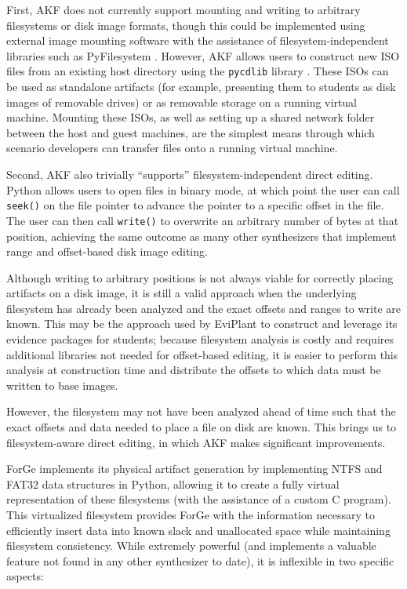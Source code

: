 \documentclass[letterpaper,12pt]{report}
\newcommand{\passthrough}[1]{#1}
\begin{document}
First, AKF does not currently support mounting and writing to arbitrary
filesystems or disk image formats, though this could be implemented
using external image mounting software with the assistance of
filesystem-independent libraries such as PyFilesystem
\cite{PyFilesystemPyfilesystem22025}. However, AKF allows users to
construct new ISO files from an existing host directory using the
\passthrough{\lstinline!pycdlib!} library
\cite{lalancetteClalancettePycdlib2025}. These ISOs can be used as
standalone artifacts (for example, presenting them to students as disk
images of removable drives) or as removable storage on a running virtual
machine. Mounting these ISOs, as well as setting up a shared network
folder between the host and guest machines, are the simplest means
through which scenario developers can transfer files onto a running
virtual machine.

Second, AKF also trivially ``supports'' filesystem-independent direct
editing. Python allows users to open files in binary mode, at which
point the user can call \passthrough{\lstinline!seek()!} on the file
pointer to advance the pointer to a specific offset in the file. The
user can then call \passthrough{\lstinline!write()!} to overwrite an
arbitrary number of bytes at that position, achieving the same outcome
as many other synthesizers that implement range and offset-based disk
image editing.

Although writing to arbitrary positions is not always viable for
correctly placing artifacts on a disk image, it is still a valid
approach when the underlying filesystem has already been analyzed and
the exact offsets and ranges to write are known. This may be the
approach used by EviPlant \cite{scanlonEviPlantEfficientDigital2017}
to construct and leverage its evidence packages for students; because
filesystem analysis is costly and requires additional libraries not
needed for offset-based editing, it is easier to perform this analysis
at construction time and distribute the offsets to which data must be
written to base images.

However, the filesystem may not have been analyzed ahead of time such
that the exact offsets and data needed to place a file on disk are
known. This brings us to filesystem-aware direct editing, in which AKF
makes significant improvements.

ForGe implements its physical artifact generation by implementing NTFS
and FAT32 data structures in Python, allowing it to create a fully
virtual representation of these filesystems (with the assistance of a
custom C program). This virtualized filesystem provides ForGe with the
information necessary to efficiently insert data into known slack and
unallocated space while maintaining filesystem consistency. While
extremely powerful (and implements a valuable feature not found in any
other synthesizer to date), it is inflexible in two specific aspects:
\end{document}
